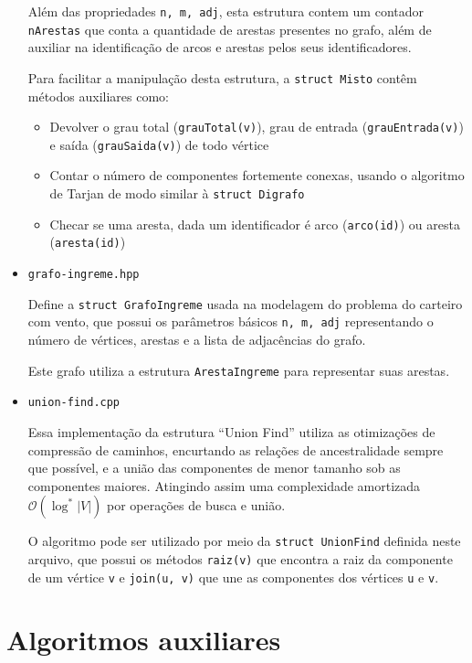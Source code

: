 \begin{itemize}
        Além das propriedades \texttt{n, m, adj}, esta estrutura contem um contador \texttt{nArestas} que conta a quantidade de arestas presentes no grafo, além de auxiliar na identificação de arcos e arestas pelos seus identificadores.

        Para facilitar a manipulação desta estrutura, a \texttt{struct Misto} contêm métodos auxiliares como:
        \begin{itemize}
            \item  Devolver o grau total (\texttt{grauTotal(v)}), grau de entrada (\texttt{grauEntrada(v)}) e saída (\texttt{grauSaida(v)}) de todo vértice
            \item Contar o número de componentes fortemente conexas, usando o algoritmo de Tarjan de modo similar à \texttt{struct Digrafo}
            \item Checar se uma aresta, dada um identificador é arco (\texttt{arco(id)}) ou aresta (\texttt{aresta(id)})
        \end{itemize}

    \item \texttt{grafo-ingreme.hpp}

    Define a \texttt{struct GrafoIngreme} usada na modelagem do problema do carteiro com vento, que possui os parâmetros básicos \texttt{n, m, adj} representando o número de vértices, arestas e a lista de adjacências do grafo.

    Este grafo utiliza a estrutura \texttt{ArestaIngreme} para representar suas arestas.

    \item \texttt{union-find.cpp}

        Essa implementação da estrutura ``Union Find'' utiliza as otimizações de compressão de caminhos, encurtando as relações de ancestralidade sempre que possível, e a união das componentes de menor tamanho sob as componentes maiores.
        Atingindo assim uma complexidade amortizada $\mathcal{O}(\log^*|V|)$ por operações de busca e união.

        O algoritmo pode ser utilizado por meio da \texttt{struct UnionFind} definida neste arquivo, que possui os métodos \texttt{raiz(v)} que encontra a raiz da componente de um vértice \texttt{v} e \texttt{join(u, v)} que une as componentes dos vértices \texttt{u} e \texttt{v}.

\end{itemize}

\section{Algoritmos auxiliares}

